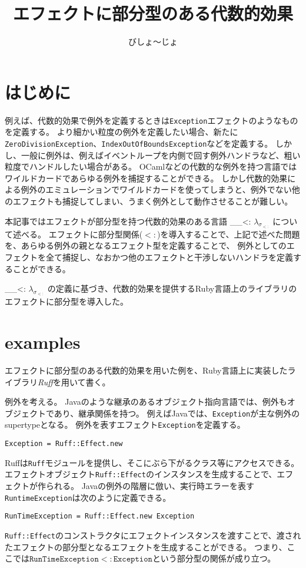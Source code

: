 \documentclass{ltjsarticle}
\author{びしょ〜じょ}
\title{エフェクトに部分型のある代数的効果}
\def\effsub{
  \ifmmode
    \lambda_{\sigma_{<:}}
  \else
    $\lambda_{\sigma_{<:}}$
  \fi
}
\begin{document}
\maketitle

\section{はじめに}

例えば、代数的効果で例外を定義するときは\texttt{Exception}エフェクトのようなものを定義する。
より細かい粒度の例外を定義したい場合、新たに\texttt{ZeroDivisionException}、\texttt{IndexOutOfBoundsException}などを定義する。
しかし、一般に例外は、例えばイベントループを内側で回す例外ハンドラなど、粗い粒度でハンドルしたい場合がある。
OCamlなどの代数的な例外を持つ言語ではワイルドカードであらゆる例外を捕捉することができる。
しかし代数的効果による例外のエミュレーションでワイルドカードを使ってしまうと、例外でない他のエフェクトも捕捉してしまい、うまく例外として動作させることが難しい。

本記事ではエフェクトが部分型を持つ代数的効果のある言語\effsub{}について述べる。
エフェクトに部分型関係($<:$)を導入することで、上記で述べた問題を、あらゆる例外の親となるエフェクト型を定義することで、%
  例外としてのエフェクトを全て捕捉し、なおかつ他のエフェクトと干渉しないハンドラを定義することができる。

\effsub{}の定義に基づき、代数的効果を提供するRuby言語上のライブラリのエフェクトに部分型を導入した。

\section{examples} \label{sec:examples}
エフェクトに部分型のある代数的効果を用いた例を、Ruby言語上に実装したライブラリ\textit{Ruff}\footnotemark{}を用いて書く。

例外を考える。
Javaのような継承のあるオブジェクト指向言語では、例外もオブジェクトであり、継承関係を持つ。
例えばJavaでは、\texttt{Exception}が主な例外のsupertypeとなる。
例外を表すエフェクト\texttt{Exception}を定義する。
\begin{lstlisting}
Exception = Ruff::Effect.new
\end{lstlisting}
Ruffは\lstinline{Ruff}モジュールを提供し、そこにぶら下がるクラス等にアクセスできる。
エフェクトオブジェクト\lstinline{Ruff::Effect}のインスタンスを生成することで、エフェクトが作られる。
Javaの例外の階層に倣い、実行時エラーを表す\texttt{RuntimeException}は次のように定義できる。
\begin{lstlisting}
RunTimeException = Ruff::Effect.new Exception
\end{lstlisting}
\lstinline{Ruff::Effect}のコンストラクタにエフェクトインスタンスを渡すことで、渡されたエフェクトの部分型となるエフェクトを生成することができる。
つまり、ここでは$\mathtt{RunTimeException} <: \mathtt{Exception}$という部分型の関係が成り立つ。
\end{document}
